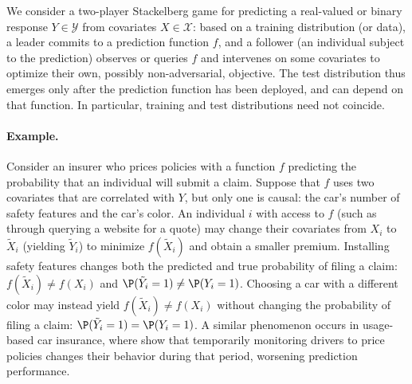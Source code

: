 
We consider a two-player Stackelberg game for predicting a real-valued or binary
response $Y \in \mathcal{Y}$ from covariates $X \in \mathcal{X}$: 
based on  a training distribution (or data),
a leader commits to a prediction function $f$, and a follower (an individual subject to the prediction) observes or queries $f$ and intervenes on some covariates to optimize their own, possibly non-adversarial, objective. The test distribution thus emerges only after the
prediction function has been deployed, and can depend on that
function. In particular, training and test distributions need not coincide.

\paragraph{Example.}
Consider an insurer who prices policies with a function $f$ predicting 
the probability that an individual will submit a claim.
Suppose that $f$ uses two covariates that are correlated with $Y$,
but only one is causal: the car's number of safety features
and the car's color.
An individual $i$ with access to $f$ (such as through querying a website for a quote)
may change their covariates from $X_i$ to $\tilde{X}_i$ (yielding  $\tilde{Y}_i$) to minimize
$f(\tilde{X}_i)$ and obtain a smaller premium. Installing safety features changes both the predicted and true probability of filing a claim: $f(\tilde{X}_i) \neq f({X_i})$ and $\P(\tilde{Y}_i = 1) \neq \P(Y_i = 1)$. 
Choosing a car with a different color %
may instead yield $f(\tilde{X}_i) \neq f({X_i})$ 
without changing the probability of filing a claim: 
$\P(\tilde{Y}_i = 1) = \P(Y_i = 1)$.
A similar phenomenon occurs in usage-based car insurance, where \citet{leeRoleMonitoringEffect2025} show that temporarily monitoring drivers to price policies changes their behavior during that period, worsening prediction performance. 

